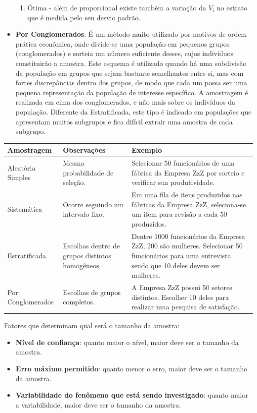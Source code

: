 \documentclass[a4paper,11pt]{article}
\begin{document}
\begin{itemize}
\begin{enumerate}
		\item Ótima - além de proporcional existe também a variação da $V_{i}$ no estrato que é medida pelo seu desvio padrão.
	\end{enumerate}
	\item \textbf{Por Conglomerados}: É um método muito utilizado por motivos de ordem prática econômica, onde divide-se uma população em pequenos grupos (conglomerados) e sorteia um número suficiente desses, cujos indivíduos constituirão a amostra. Este esquema é utilizado quando há uma subdivisão da população em grupos que sejam bastante semelhantes entre si, mas com fortes discrepâncias dentro dos grupos, de modo que cada um possa ser uma pequena representação da população de interesse específico. A amostragem é realizada em cima dos conglomerados, e não mais sobre os indivíduos da população. Diferente da Estratificada, este tipo é indicado em populações que apresentam muitos subgrupos e fica difícil extrair uma amostra de cada subgrupo.
\end{itemize}

\begin{table}[H]
	\centering 
	\begin{tabular}{m{3cm}|m{4cm}|m{5.5cm}}
		\textbf{Amostragem} & \textbf{Observações} & \textbf{Exemplo} \\
		\hline
		Aleatória Simples & Mesma probabilidade de seleção. & Selecionar 50 funcionários de uma fábrica da Empresa ZzZ por sorteio e verificar sua produtividade. \\
		Sistemática & Ocorre seguindo um intervalo fixo. & Em uma fila de itens produzidos nas fábricas da Empresa ZzZ, seleciona-se um item para revisão a cada 50 produzidos. \\
		Estratificada & Escolhas dentro de grupos distintos homogêneos. & Dentre 1000 funcionários da Empresa ZzZ, 200 são mulheres. Selecionar 50 funcionários para uma entrevista sendo que 10 deles devem ser mulheres. \\
		Por Conglomerados & Escolhas de grupos completos. & A Empresa ZzZ possui 50 setores distintos. Escolher 10 deles para realizar uma pesquisa de satisfação.
	\end{tabular}
\end{table}

Fatores que determinam qual será o tamanho da amostra:
\begin{itemize}
	\item \textbf{Nível de confiança}: quanto maior o nível, maior deve ser o tamanho da amostra.
	\item \textbf{Erro máximo permitido}: quanto menor o erro, maior deve ser o tamanho da amostra.
	\item \textbf{Variabilidade do fenômeno que está sendo investigado}: quanto maior a variabilidade, maior deve ser o tamanho da amostra.
\end{itemize}
\end{document}
